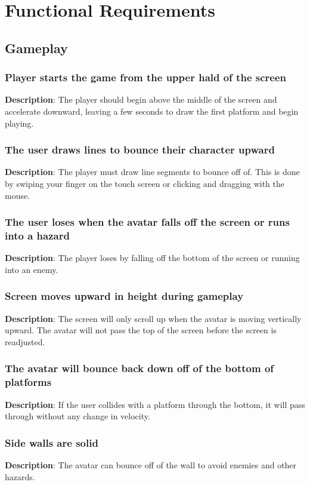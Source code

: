 \chapter{Functional Requirements}
\section{Gameplay}
\renewcommand{\thesubsection}{GAME-%
\ifnum\value{subsection}<10 0\fi
\arabic{subsection}}
\subsection{Player starts the game from the upper hald of the screen}
\textbf{Description}: The player should begin above the middle of the screen and accelerate
downward, leaving a few seconds to draw the first platform and begin
playing.

\subsection{The user draws lines to bounce their character upward}
\textbf{Description}: The player must draw line segments to bounce
off of. This is done by swiping your finger on the touch screen or
clicking and dragging with the mouse.

\subsection{The user loses when the avatar falls off the screen or runs
into a hazard}
\textbf{Description}: The player loses by falling off the bottom of
the screen or running into an enemy.

\subsection{Screen moves upward in height during gameplay}
\textbf{Description}: The screen will only scroll up when the avatar
is moving vertically upward. The avatar will not pass the top of the
screen before the screen is readjusted.

\subsection{The avatar will bounce back down off of the bottom of platforms}
\textbf{Description}: If the user collides with a platform through
the bottom, it will pass through without any change in velocity.

\subsection{Side walls are solid}
\textbf{Description}: The avatar can bounce off of the wall to avoid enemies and other hazards.

